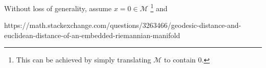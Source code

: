 \documentclass[fontsize=12pt]{article}
\newcommand{\calM}{\mathcal{M}}
\begin{document}
Without loss of generality, assume $x = 0 \in \calM$ \footnote{This can be achieved by simply translating $\calM$ to contain 0.} and  





https://math.stackexchange.com/questions/3263466/geodesic-distance-and-euclidean-distance-of-an-embedded-riemannian-manifold



\end{document}
